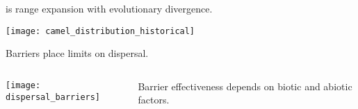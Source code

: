 \documentclass[t]{beamer}
\begin{document}
%
\begin{frame}[t]{ is range expansion with evolutionary divergence.}

	\vspace*{-0.5\baselineskip}
	{\centering
	\texttt{[image: camel\_distribution\_historical]}\par
	}
	
	\vfilll
	
\end{frame}
%
{
\begin{frame}[b]

\end{frame}
}
%
\begin{frame}[t]{Barriers place limits on dispersal.}

	\vspace*{-1\baselineskip}
	
	\begin{columns}
		\begin{column}{0.6\textwidth}
		
		\texttt{[image: dispersal\_barriers]}
		\end{column}
		
		\begin{column}{0.35\textwidth}
		
		\hangpara {}

		\hangpara {}

		\hangpara Barrier effectiveness depends on biotic and abiotic factors.
		\end{column}
	\end{columns}
	
\end{frame}
%
\end{document}
